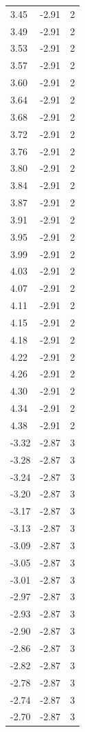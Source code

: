 \begin{longtable}{lrr}
  3.45 & -2.91 & 2 \\
  3.49 & -2.91 & 2 \\
  3.53 & -2.91 & 2 \\
  3.57 & -2.91 & 2 \\
  3.60 & -2.91 & 2 \\
  3.64 & -2.91 & 2 \\
  3.68 & -2.91 & 2 \\
  3.72 & -2.91 & 2 \\
  3.76 & -2.91 & 2 \\
  3.80 & -2.91 & 2 \\
  3.84 & -2.91 & 2 \\
  3.87 & -2.91 & 2 \\
  3.91 & -2.91 & 2 \\
  3.95 & -2.91 & 2 \\
  3.99 & -2.91 & 2 \\
  4.03 & -2.91 & 2 \\
  4.07 & -2.91 & 2 \\
  4.11 & -2.91 & 2 \\
  4.15 & -2.91 & 2 \\
  4.18 & -2.91 & 2 \\
  4.22 & -2.91 & 2 \\
  4.26 & -2.91 & 2 \\
  4.30 & -2.91 & 2 \\
  4.34 & -2.91 & 2 \\
  4.38 & -2.91 & 2 \\
  -3.32 & -2.87 & 3 \\
  -3.28 & -2.87 & 3 \\
  -3.24 & -2.87 & 3 \\
  -3.20 & -2.87 & 3 \\
  -3.17 & -2.87 & 3 \\
  -3.13 & -2.87 & 3 \\
  -3.09 & -2.87 & 3 \\
  -3.05 & -2.87 & 3 \\
  -3.01 & -2.87 & 3 \\
  -2.97 & -2.87 & 3 \\
  -2.93 & -2.87 & 3 \\
  -2.90 & -2.87 & 3 \\
  -2.86 & -2.87 & 3 \\
  -2.82 & -2.87 & 3 \\
  -2.78 & -2.87 & 3 \\
  -2.74 & -2.87 & 3 \\
  -2.70 & -2.87 & 3 \\

\end{longtable}
